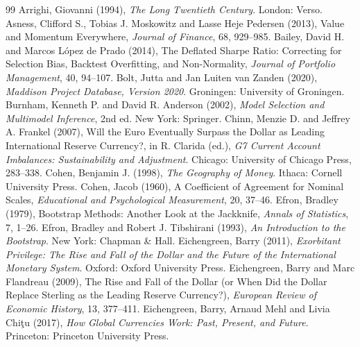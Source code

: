\documentclass[11pt,letterpaper]{article}
\theoremstyle{definition}
\theoremstyle{plain}
\begin{document}
\begin{thebibliography}{99}\setlength{\itemsep}{1pt}\small
{} Arrighi, Giovanni (1994), \emph{The Long Twentieth Century}. London: Verso.
 Asness, Clifford S., Tobias J. Moskowitz and Lasse Heje Pedersen (2013), Value and Momentum Everywhere, \emph{Journal of Finance}, 68, 929--985.
 Bailey, David H. and Marcos L\'opez de Prado (2014), The Deflated Sharpe Ratio: Correcting for Selection Bias, Backtest Overfitting, and Non-Normality, \emph{Journal of Portfolio Management}, 40, 94--107.
 Bolt, Jutta and Jan Luiten van Zanden (2020), \emph{Maddison Project Database, Version 2020}. Groningen: University of Groningen.
 Burnham, Kenneth P. and David R. Anderson (2002), \emph{Model Selection and Multimodel Inference}, 2nd ed. New York: Springer.
 Chinn, Menzie D. and Jeffrey A. Frankel (2007), Will the Euro Eventually Surpass the Dollar as Leading International Reserve Currency?, in R. Clarida (ed.), \emph{G7 Current Account Imbalances: Sustainability and Adjustment}. Chicago: University of Chicago Press, 283--338.
 Cohen, Benjamin J. (1998), \emph{The Geography of Money}. Ithaca: Cornell University Press.
 Cohen, Jacob (1960), A Coefficient of Agreement for Nominal Scales, \emph{Educational and Psychological Measurement}, 20, 37--46.
 Efron, Bradley (1979), Bootstrap Methods: Another Look at the Jackknife, \emph{Annals of Statistics}, 7, 1--26.
 Efron, Bradley and Robert J. Tibshirani (1993), \emph{An Introduction to the Bootstrap}. New York: Chapman \& Hall.
 Eichengreen, Barry (2011), \emph{Exorbitant Privilege: The Rise and Fall of the Dollar and the Future of the International Monetary System}. Oxford: Oxford University Press.
 Eichengreen, Barry and Marc Flandreau (2009), The Rise and Fall of the Dollar (or When Did the Dollar Replace Sterling as the Leading Reserve Currency?), \emph{European Review of Economic History}, 13, 377--411.
 Eichengreen, Barry, Arnaud Mehl and Livia Chi\c{t}u (2017), \emph{How Global Currencies Work: Past, Present, and Future}. Princeton: Princeton University Press.

\end{thebibliography}
\end{document}
